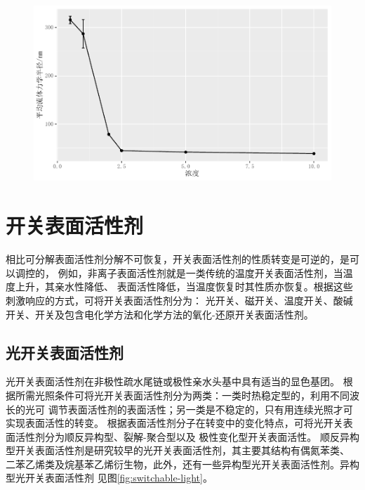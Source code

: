 \documentclass[bachelor,adobefonts]{jnuthesis} %
\begin{document}
        \begin{figure}
            \centering
            \includegraphics[width=0.7\linewidth]{Figure/test.pdf}
            \caption{}
            \label{fig:plot01}
        \end{figure}
        
    \section{开关表面活性剂}
    相比可分解表面活性剂分解不可恢复，开关表面活性剂的性质转变是可逆的，是可以调控的，
    例如，非离子表面活性剂就是一类传统的温度开关表面活性剂，当温度上升，其亲水性降低、
    表面活性降低，当温度恢复时其性质亦恢复。根据这些刺激响应的方式，可将开关表面活性剂分为：
    光开关、磁开关、温度开关、酸碱开关、开关及包含电化学方法和化学方法的氧化-还原开关表面活性剂\cite{秦勇2009}。
    
    \subsection{光开关表面活性剂}
    光开关表面活性剂在非极性疏水尾链或极性亲水头基中具有适当的显色基团\cite{张冤帝2017}。
    根据所需光照条件可将光开关表面活性剂分为两类：一类时热稳定型的，利用不同波长的光可
    调节表面活性剂的表面活性；另一类是不稳定的，只有用连续光照才可实现表面活性的转变。
    根据表面活性剂分子在转变中的变化特点，可将光开关表面活性剂分为顺反异构型、裂解-聚合型以及
    极性变化型开关表面活性\cite{张冤帝2017,李云霞2011}。
    顺反异构型开关表面活性剂是研究较早的光开关表面活性剂，其主要其结构有偶氮苯类、
    二苯乙烯类及烷基苯乙烯衍生物，此外，还有一些异构型光开关表面活性剂。异构型光开关表面活性剂
    见图\ref{fig:switchable-light}\cite{张冤帝2017,karthaus1996,shang2003,吕湘亮2018}。
    
\end{document}
